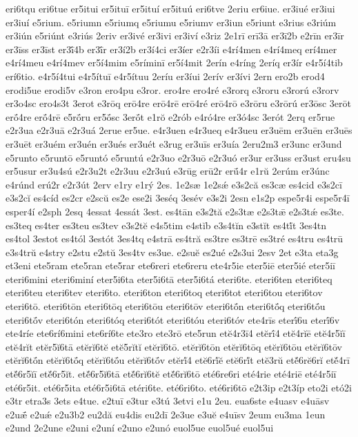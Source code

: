 {eri6tqu
eri6tue
er5itui
er5ituī
er5ituí
er5ituú
eri6tve
2eriu
er6iue.
er3iué
er3iui
er3iuí
e5rium.
e5riumn
e5riumq
e5riumu
e5riumv
er3iun
e5riunt
e3rius
e3riúm
er3iún
e5riúnt
e3riús
2eriv
er3ivé
er3ivi
er3iví
e3riz
2e1rī
erī3ā
er3ī2b
e2rīn
er3īr
er3īss
er3īst
er3ī́4b
er3ī́r
er3í2b
er3í4ci
er3íer
e2r3íi
e4rí4men
e4rí4meq
erí4mer
e4rí4meu
e4rí4mev
er5í4mim
e5ríminī
er5í4mit
2erín
e4ríng
2eríq
er3ír
e4r5í4tib
erí6tio.
e4r5í4tui
e4r5ítuī
e4r5ítuu
2eríu
er3íui
2erív
er3ívi
2ern
ero2b
erod4
erodi5ue
erodi5v
e3ron
ero4pu
e3ror.
ero4re
ero4ré
e3rorq
e3roru
e3rorú
e3rorv
er3o4sc
ero4s3t
3erot
e3rōq
erō4re
erō4rē
erō4ré
erō4rō
e3rōru
e3rōrú
er3ōsc
3erōt
erṓ4re
erṓ4rē
e5rṓru
er5ṓsc
3erṓt
e1rŏ
e2rób
e4ró4re
er3ó4sc
3erót
2erq
er5rue
e2r3ua
e2r3uā
e2r3uá
2erue
er5ue.
e4r3uen
e4r3ueq
e4r3ueu
er3uēm
er3uēn
er3uēs
er3uēt
er3uém
er3uén
er3ués
er3uét
e3rug
er3uīs
er3uía
2eru2m3
er3unc
er3und
e5runto
e5runtō
e5runtó
e5runtú
e2r3uo
e2r3uō
e2r3uó
er3ur
er3uss
er3ust
eru4su
er5usur
er3u4sú
e2r3u2t
e2r3uu
e2r3uú
e3rūg
erū2r
erū́4r
e1rŭ
2erúm
er3únc
e4rúnd
erú2r
e2r3út
2erv
e1ry
e1rý
2es.
1e2sæ
1e2sǽ
e3s2că
es3cæ
es4cid
e3s2cī
e3s2cĭ
es4cíd
es2cr
e2scŭ
es2e
ese2i
3eséq
3esév
e3s2i
2esn
e1s2p
espe5r4i
espe5r4ī
esper4í
e2sph
2esq
4essat
4essát
3est.
es4tān
e3s2tă
e2s3tæ
e2s3tǣ
e2s3tǽ
es3te.
es3teq
es4ter
es3teu
es3tev
e3s2tĕ
e4s5tim
e4stĭb
e3s4tĭn
e3stĭt
es4tĭ́t
3es4tn
es4tol
3estot
es4tól
3estót
3es4tq
e4strā
es4tră
es3tre
es3trē
es3tré
es4tru
es4trū
e3s4trŭ
e4stry
e2stu
e2stŭ
3es4tv
es3ue.
e2suĕ
es2ué
e2s3ui
2esv
2et
e3ta
eta3g
et3eni
ete5ram
ete5ran
ete5rar
ete6reri
ete6reru
ete4r5ie
eter5iē
eter5ié
eter5iī
eteri6mini
eteri6miní
eter5i6ta
eter5i6tā
eter5i6tá
eteri6te.
eteri6ten
eteri6teq
eteri6teu
eteri6tev
eteri6to.
eteri6ton
eteri6toq
eteri6tot
eteri6tou
eteri6tov
eteri6tō.
eteri6tōn
eteri6tōq
eteri6tōu
eteri6tōv
eteri6tṓn
eteri6tṓq
eteri6tṓu
eteri6tṓv
eteri6tón
eteri6tóq
eteri6tót
eteri6tóu
eteri6tóv
ete4rīs
eterī́6u
eterī́6v
ete4ríe
ete6rí6mini
ete6rí6te
ete3ro
ete3rō
ete5run
etĕ4r3ī4
etĕrī́4
etĕ4rĭē
etĕ4r5ĭī
etĕ4rĭt
etĕr5ĭ6tā
etĕrĭ6tĕ
etĕ5rĭtĭ
etĕrĭ6tō.
etĕrĭ6tōn
etĕrĭ6tōq
etĕrĭ6tōu
etĕrĭ6tōv
etĕrĭ6tṓn
etĕrĭ6tṓq
etĕrĭ6tṓu
etĕrĭ6tṓv
etĕrĭ́4
etĕ6rĭ́ĕ
etĕ6rĭ́t
etĕ3rŭ
etĕ́6rĕ6rĭ
etĕ́4rī
etĕ́6r5ĭī
etĕ́6r5ĭt.
etĕ́6r5ĭ6tā
etĕ́6rĭ6tĕ
etĕ́6rĭ6tō
eté6re6ri
eté4rie
eté4riē
eté4r5iī
eté6r5it.
eté6r5ita
eté6r5i6tā
etéri6te.
eté6ri6to.
eté6ri6tō
e2t3ip
e2t3íp
eto2i
etó2i
e3tr
etra3s
3ets
e4tue.
e2tuī
e3tur
e3tú
3etvi
e1u
2eu.
eua6ste
e4uasv
e4uāsv
e2uǣ́
e2uǽ
e2u3b2
eu2dă
eu4dis
eu2dī
2e3ue
e3uĕ
e4uīsv
2eum
eu3ma
1eun
e2und
2e2une
e2uni
e2uní
e2uno
e2unó
euol5ue
euol5ué
euol5ui
}
